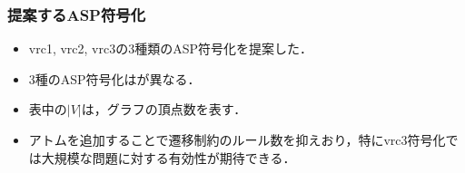 \documentclass[dvipdfmx,11pt]{beamer}
\begin{document}

\begin{frame}\frametitle{提案するASP符号化}

  \begin{itemize}
    \item vrc1, vrc2, vrc3の3種類のASP符号化を提案した．
    \item 3種のASP符号化はが異なる．
    \item 表中の$|V|$は，グラフの頂点数を表す．
  \end{itemize}

  \begin{table}
    \centering
    
  \end{table}

  \begin{itemize}
    \item アトムを追加することで遷移制約のルール数を抑えおり，特にvrc3符号化では大規模な問題に対する有効性が期待できる．
  \end{itemize}

\end{frame}

\begin{comment}
\begin{frame}\frametitle{ベンチマーク}

  \begin{itemize}
    \item 現時点で組合せ遷移問題は理論面の研究が主流であり, ベンチマークの整備が必要.
    \item 実験においてステップ$t$を与えるとき, その上限値が必要となる.
    \item ステップ$t$の上限値は, グラフ$G$を$k$彩色するときの実行可能解の数と等しい.
  \end{itemize}

  従って, 全解列挙が可能な($G, k$)からベンチマークを生成する必要がある.
  
\end{frame}
\end{comment}
\end{document}
